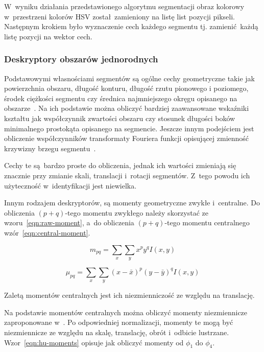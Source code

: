 W~wyniku działania przedstawionego algorytmu segmentacji obraz kolorowy w~przestrzeni kolorów HSV został zamieniony na listę list pozycji pikseli. Następnym krokiem było wyznaczenie cech każdego segmentu tj. zamienić każdą listę pozycji na wektor cech.

\subsubsection{Deskryptory obszarów jednorodnych}
Podstawowymi własnościami segmentów są ogólne cechy geometryczne takie jak powierzchnia obszaru, długość konturu, długość rzutu pionowego i poziomego, środek ciężkości segmentu czy średnica najmniejszego okręgu opisanego na obszarze~\cite{perm:wyklad}. Na ich podstawie można obliczyć bardziej zaawansowane wskaźniki kształtu jak współczynnik zwartości obszaru czy stosunek długości boków minimalnego prostokąta opisanego na segmencie. Jeszcze innym podejściem jest obliczenie współczynników transformaty Fouriera funkcji opisującej zmienność krzywizny brzegu segmentu~\cite{pobr:wyklad}.

Cechy te są bardzo proste do obliczenia, jednak ich wartości zmieniają się znacznie przy zmianie skali, translacji i~rotacji segmentów. Z~tego powodu ich użyteczność w~identyfikacji jest niewielka. 

Innym rodzajem deskryptorów, są momenty geometryczne zwykłe i~centralne. Do obliczenia $(p+q)$-tego momentu zwykłego należy skorzystać ze wzoru~\ref{eqn:raw-moment}, a~do obliczenia $(p+q)$-tego momentu centralnego wzór~\ref{eqn:central-moment}.

\begin{equation}
    m_{pq} = \sum_x \sum_y x^{p} y^{q} I(x,y)
    \label{eqn:raw-moment}
\end{equation}

\begin{equation}
    \mu_{pq} = \sum_x \sum_y (x - \bar{x})^{p} (y - \bar{y})^{q} I(x,y)
    \label{eqn:central-moment}
\end{equation}

Zaletą momentów centralnych jest ich niezmienniczość ze względu na translację. 

Na podstawie momentów centralnych można obliczyć momenty niezmiennicze zaproponowane w~\cite{hu}. Po odpowiedniej normalizacji, momenty te mogą być niezmiennicze ze względu na skalę, translację, obrót i~odbicie lustrzane. Wzor~\ref{eqn:hu-moments} opisuje jak obliczyć momenty od $\phi_{1}$ do $\phi_{4}$.  

